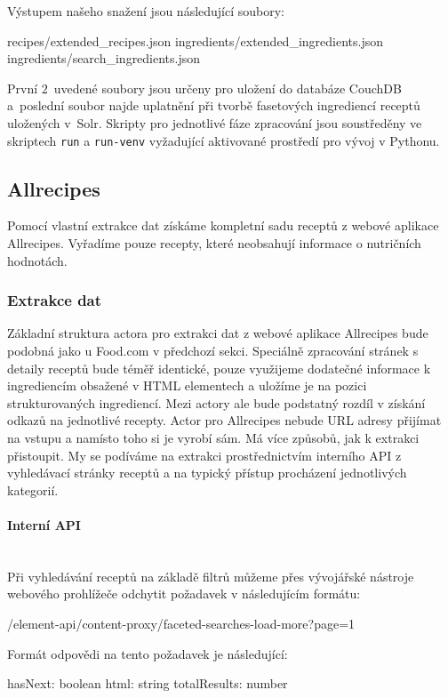Výstupem našeho snažení jsou následující soubory:

\begin{code}
recipes/extended_recipes.json
ingredients/extended_ingredients.json
ingredients/search_ingredients.json
\end{code}

První $2$~uvedené soubory jsou určeny pro uložení do databáze CouchDB a~poslední soubor najde uplatnění při tvorbě fasetových ingrediencí receptů uložených v~Solr. Skripty pro jednotlivé fáze zpracování jsou soustředěny ve skriptech \texttt{run} a \texttt{run-venv} vyžadující aktivované prostředí pro vývoj v Pythonu.

\subsection{Allrecipes}

Pomocí vlastní extrakce dat získáme kompletní sadu receptů z webové aplikace Allrecipes. Vyřadíme pouze recepty, které neobsahují informace o nutričních hodnotách.

\subsubsection{Extrakce dat}

Základní struktura actora pro extrakci dat z webové aplikace Allrecipes bude podobná jako u Food.com v předchozí sekci. Speciálně zpracování stránek s detaily receptů bude téměř identické, pouze využijeme dodatečné informace k ingrediencím obsažené v HTML elementech a uložíme je na pozici strukturovaných ingrediencí. Mezi actory ale bude podstatný rozdíl v získání odkazů na jednotlivé recepty. Actor pro Allrecipes nebude URL adresy přijímat na vstupu a namísto toho si je vyrobí sám. Má více způsobů, jak k extrakci přistoupit. My se podíváme na extrakci prostřednictvím interního API z vyhledávací stránky receptů a na typický přístup procházení jednotlivých kategorií.

\paragraph{Interní API}\mbox{}\\

Při vyhledávání receptů na základě filtrů můžeme přes vývojářské nástroje webového prohlížeče odchytit požadavek v následujícím formátu:

\begin{code}
/element-api/content-proxy/faceted-searches-load-more?page=1
\end{code}
Formát odpovědi na tento požadavek je následující:
\begin{code}
{
    hasNext: boolean
    html: string
    totalResults: number
}
\end{code}

